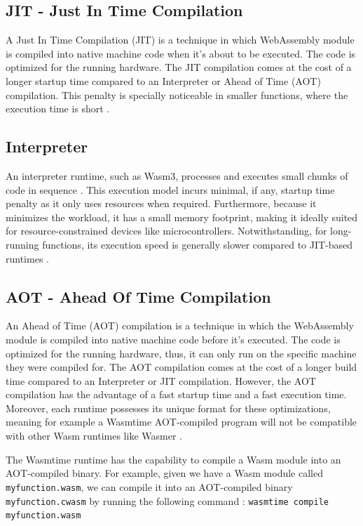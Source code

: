 \subsection{JIT - Just In Time Compilation}
\label{sec:jit}

A Just In Time Compilation (JIT) is a technique in which WebAssembly module is compiled into native machine code when it's about to be executed. The code is optimized for the running hardware. The JIT compilation comes at the cost of a longer startup time compared to an Interpreter or Ahead of Time (AOT) compilation. This penalty is specially noticeable in smaller functions, where the execution time is short \cite{butcher_2023_the}. 

\subsection{Interpreter}
\label{sec:interpreter}

An interpreter runtime, such as Wasm3, processes and executes small chunks of code in sequence \cite{shymanskyy_2023_wasm3}. This execution model incurs minimal, if any, startup time penalty as it only uses resources when required. Furthermore, because it minimizes the workload, it has a small memory footprint, making it ideally suited for resource-constrained devices like microcontrollers. Notwithstanding, for long-running functions, its execution speed is generally slower compared to JIT-based runtimes \cite{butcher_2023_the}. 

\subsection{AOT - Ahead Of Time Compilation}
\label{sec:aot}

An Ahead of Time (AOT) compilation is a technique in which the WebAssembly module is compiled into native machine code before it's executed. The code is optimized for the running hardware, thus, it can only run on the specific machine they were compiled for. The AOT compilation comes at the cost of a longer build time compared to an Interpreter or JIT compilation. However, the AOT compilation has the advantage of a fast startup time and a fast execution time. Moreover, each runtime possesses its unique format for these optimizations, meaning for example a Wasmtime AOT-compiled program will not be compatible with other Wasm runtimes like Wasmer \cite{butcher_2023_the}. 

The Wasmtime runtime has the capability to compile a Wasm module into an AOT-compiled binary. For example, given we have a Wasm module called \texttt{myfunction.wasm}, we can compile it into an AOT-compiled binary \texttt{myfunction.cwasm} by running the following command \cite{bytecodealliance_2022_wasmtime}: \texttt{wasmtime compile myfunction.wasm}

